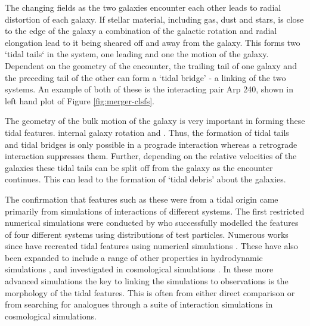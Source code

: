 The changing \DIFdelbegin {}\DIFdelend \DIFaddbegin {}\DIFaddend fields as the two galaxies encounter each other leads to radial distortion of each galaxy. If stellar material, including gas, dust and stars, is close to the edge of the galaxy a combination of the galactic rotation and radial elongation lead to it being sheared off and away from the galaxy. This forms two `tidal tails` in the system, one leading and one \DIFdelbegin {}\DIFdelend \DIFaddbegin {}\DIFaddend the motion of the galaxy. Dependent on the geometry of the encounter, the trailing tail of one galaxy and the preceding tail of the other can form a `tidal bridge' - a linking of the two systems. An example of both of these is the interacting pair Arp 240, shown in left hand plot of Figure \ref{fig:merger-clsfs}. 

The geometry of the bulk motion of the galaxy is very important in forming these tidal features. \DIFdelbegin {}\DIFdelend \DIFaddbegin {}\DIFaddend internal galaxy rotation and \DIFdelbegin {}\DIFdelend \DIFaddbegin {}\DIFaddend . Thus, the formation of tidal tails and tidal bridges is only possible in a prograde interaction whereas a retrograde interaction suppresses them. Further, depending on the relative velocities of the galaxies these tidal tails can be split off from the galaxy as the encounter continues. This can lead to the formation of `tidal debris' about the galaxies.

The confirmation that features such as these were from a tidal origin came primarily from simulations of interactions of different systems. The first restricted numerical simulations were conducted by \citet{1972ApJ...178..623T} who successfully modelled the features of four different systems using distributions of test particles. Numerous works since have recreated tidal features using numerical simulations \citep{1993ApJ...410..586S, 2008AN....329.1046P, 2009AJ....137.3071B, 2016A&C....16...26W}. These have also been expanded to include a range of other properties in hydrodynamic simulations \citep{2013MNRAS.430.1901H, 2019MNRAS.485.1320M, 2021MNRAS.503.3113M, 2022MNRAS.509.2720S}, and investigated in cosmological simulations \citep{2015MNRAS.452.2845K, 2019MNRAS.490.2139R, 2020MNRAS.493.3716H, 2023RAA....23k5018D}. In these more advanced simulations the key to linking the simulations to observations is the morphology of the tidal features. This is often from either direct comparison or from searching for analogues through a suite of interaction simulations in cosmological simulations.

